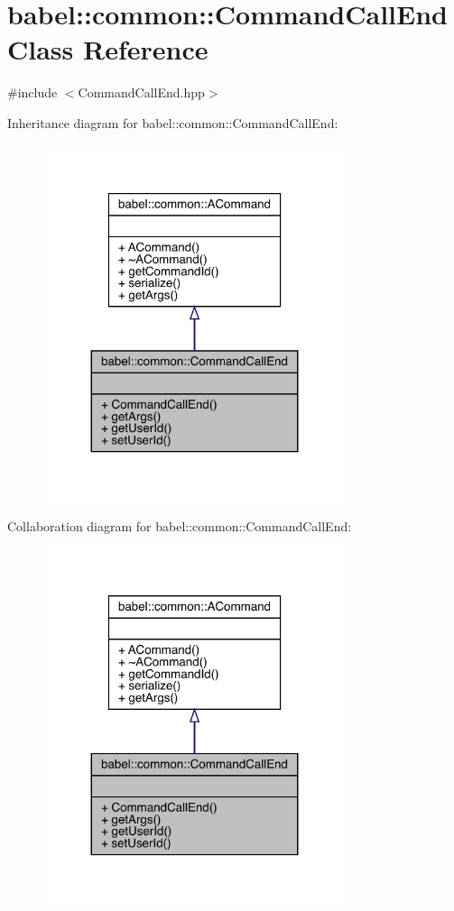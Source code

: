 \hypertarget{classbabel_1_1common_1_1_command_call_end}{}\section{babel\+:\+:common\+:\+:Command\+Call\+End Class Reference}
\label{classbabel_1_1common_1_1_command_call_end}


{\ttfamily \#include $<$Command\+Call\+End.\+hpp$>$}



Inheritance diagram for babel\+:\+:common\+:\+:Command\+Call\+End\+:\nopagebreak
\begin{figure}[H]
\begin{center}
\leavevmode
\includegraphics[width=251pt]{classbabel_1_1common_1_1_command_call_end__inherit__graph}
\end{center}
\end{figure}


Collaboration diagram for babel\+:\+:common\+:\+:Command\+Call\+End\+:\nopagebreak
\begin{figure}[H]
\begin{center}
\leavevmode
\includegraphics[width=251pt]{classbabel_1_1common_1_1_command_call_end__coll__graph}
\end{center}
\end{figure}
